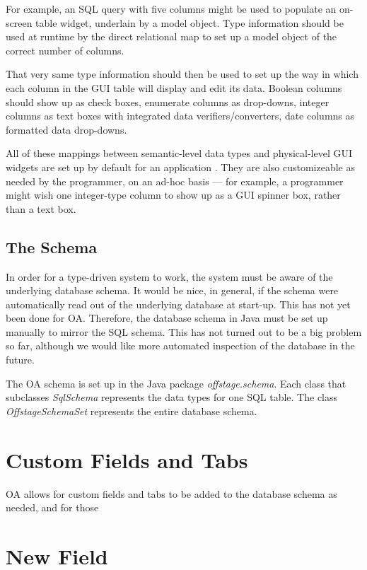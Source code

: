 \documentclass[11pt]{article}
\begin{document}
For example, an SQL query with five columns might be used to populate an on-screen table widget, underlain by a model object.  Type information should be used at runtime by the direct relational map to set up a model object of the correct number of columns.

That very same type information should then be used to set up the way in which each column in the GUI table will display and edit its data.  Boolean columns should show up as check boxes, enumerate columns as drop-downs, integer columns as text boxes with integrated data verifiers/converters, date columns as formatted data drop-downs.

All of these mappings between semantic-level data types and physical-level GUI widgets are set up by default for an application .  They are also customizeable as needed by the programmer, on an ad-hoc basis --- for example, a programmer might wish one integer-type column to show up as a GUI spinner box, rather than a text box.

\subsection{The Schema}

In order for a type-driven system to work, the system must be aware of the underlying database schema.  It would be nice, in general, if the schema were automatically read out of the underlying database at start-up.  This has not yet been done for OA.  Therefore, the database schema in Java must be set up manually to mirror the SQL schema.  This has not turned out to be a big problem so far, although we would like more automated inspection of the database in the future.

The OA schema is set up in the Java package \emph{offstage.schema}.  Each class that subclasses \emph{SqlSchema} represents the data types for one SQL table.  The class \emph{OffstageSchemaSet} represents the entire database schema.

\section{Custom Fields and Tabs}

OA allows for custom fields and tabs to be added to the database schema as needed, and for those

\section{New Field}
\end{document}
